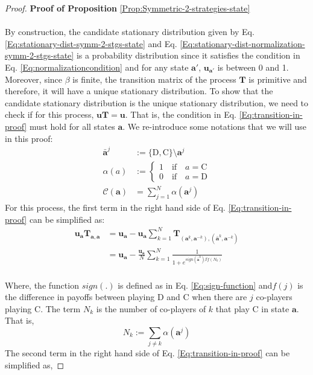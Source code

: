 \documentclass[11pt]{article}
\theoremstyle{plainCl1}
\theoremstyle{plainCl2}
\newcommand{\abf}{\mathbf{a}}
\newcommand{\T}{\mathbf{T}}
\newcommand{\ubf}{\mathbf{u}}
\newcommand{\C}{\mathrm{C}}
\newcommand{\D}{\mathrm{D}}
\begin{document}
\begin{proof}
\textbf{Proof of Proposition} \ref{Prop:Symmetric-2-strategies-state} \\ \\
By construction, the candidate stationary distribution given by Eq. \ref{Eq:stationary-dist-symm-2-stgs-state} and Eq. \ref{Eq:stationary-dist-normalization-symm-2-stgs-state} is a probability distribution since it satisfies the condition in Eq. \ref{Eq:normalizationcondition} and for any state $\abf'$, $\ubf_{\abf'}$ is between 0 and 1.  Moreover, since $\beta$ is finite, the transition matrix of the process $\T$ is primitive and therefore, it will have a unique stationary distribution. To show that the candidate stationary distribution is the unique stationary distribution, we need to check if for this process, $\ubf \T= \ubf$. That is, the condition in Eq. \ref{Eq:transition-in-proof} must hold for all states $\abf$. We re-introduce some notations that we will use in this proof: 
\begin{align}
\bar{\abf}^j &:= \{\D,\C\} \setminus \abf^j \\[10pt]
\alpha(a)&:= 
\begin{cases}
1 \quad \text{if} \quad a = \C \\[10pt]
0 \quad \text{if} \quad a = \D 
\end{cases}\\[10pt]
\mathcal{C}(\abf) &= \sum_{j=1}^N \alpha(\abf^j)
\end{align}
For this process, the first term in the right hand side of Eq. \ref{Eq:transition-in-proof} can be simplified as: 
\begin{align}
\ubf_{\abf} \T_{\abf,\abf}  &= \ubf_\abf - \ubf_{\abf} \sum_{k=1}^{N} \T_{(\abf^k, \abf^{-k}),(\bar{\abf}^{k}, \abf^{-k})} \\[10pt]
&= \ubf_{\abf} - \frac{\ubf_{\abf}}{N} \sum_{k=1}^N \frac{1}{1 + \displaystyle e^{\mathit{sign}(\bar{\abf}^{k}) \beta f(N_k)}}
\label{Eq:T_aa_u_a term}
\end{align}
\\ \noindent Where, the function $\mathit{sign}(.)$ is  defined as in Eq. \ref{Eq:sign-function} and$f(j)$ is the difference in payoffs between playing $\D$ and $\C$ when there are $j$ co-players playing $\C$. The term $N_k$ is the number of co-players of $k$ that play $\C$ in state $\abf$. That is,
\begin{equation}
N_k := \sum_{j \neq k} \alpha(\abf^j)
\end{equation}
The second term in the right hand side of Eq. \ref{Eq:transition-in-proof} can be simplified as, 

\end{proof}
\end{document}
